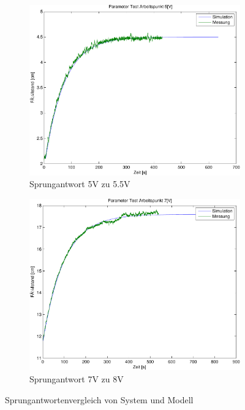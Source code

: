 \begin{figure}[h!]
	\centering
	\begin{subfigure}{0.475\textwidth}
		\includegraphics[width=1\textwidth]{07/parameter_test_5.pdf}
		\caption{Sprungantwort 5V zu 5.5V}
	\end{subfigure}
	\hfill{}
	\begin{subfigure}{0.475\textwidth}
		\includegraphics[width=1\textwidth]{07/parameter_test_7.pdf}
		\caption{Sprungantwort 7V zu 8V}
	\end{subfigure}
	\caption{Sprungantwortenvergleich von System und Modell}
\end{figure}

